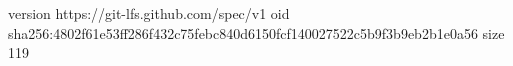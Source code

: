 version https://git-lfs.github.com/spec/v1
oid sha256:4802f61e53ff286f432c75febc840d6150fcf140027522c5b9f3b9eb2b1e0a56
size 119
